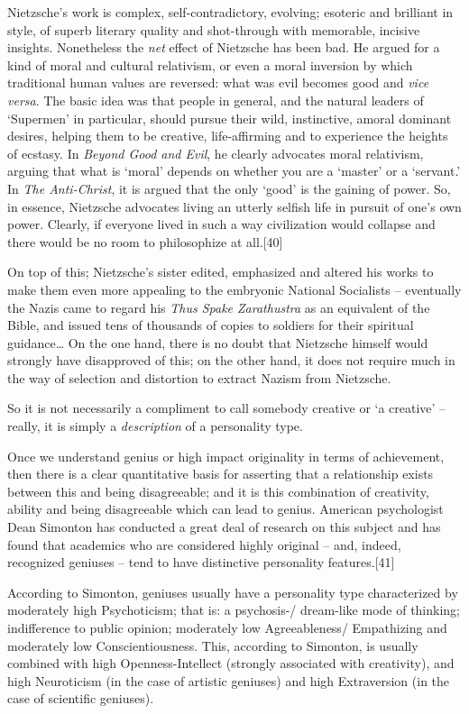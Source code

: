 \documentclass[
]{book}
\begin{document}
Nietzsche's work is complex, self-contradictory, evolving; esoteric and brilliant in style, of superb literary quality and shot-through with memorable, incisive insights. Nonetheless the \emph{net} effect of Nietzsche has been bad. He argued for a kind of moral and cultural relativism, or even a moral inversion by which traditional human values are reversed: what was evil becomes good and \emph{vice versa}. The basic idea was that people in general, and the natural leaders of `Supermen' in particular, should pursue their wild, instinctive, amoral dominant desires, helping them to be creative, life-affirming and to experience the heights of ecstasy. In \emph{Beyond Good and Evil}, he clearly advocates moral relativism, arguing that what is `moral' depends on whether you are a `master' or a `servant.' In \emph{The Anti-Christ}, it is argued that the only `good' is the gaining of power. So, in essence, Nietzsche advocates living an utterly selfish life in pursuit of one's own power. Clearly, if everyone lived in such a way civilization would collapse and there would be no room to philosophize at all.{[}40{]}

On top of this; Nietzsche's sister edited, emphasized and altered his works to make them even more appealing to the embryonic National Socialists -- eventually the Nazis came to regard his \emph{Thus Spake Zarathustra} as an equivalent of the Bible, and issued tens of thousands of copies to soldiers for their spiritual guidance\ldots{} On the one hand, there is no doubt that Nietzsche himself would strongly have disapproved of this; on the other hand, it does not require much in the way of selection and distortion to extract Nazism from Nietzsche.

So it is not necessarily a compliment to call somebody creative or `a creative' -- really, it is simply a \emph{description} of a personality type.

Once we understand genius or high impact originality in terms of achievement, then there is a clear quantitative basis for asserting that a relationship exists between this and being disagreeable; and it is this combination of creativity, ability and being disagreeable which can lead to genius. American psychologist Dean Simonton has conducted a great deal of research on this subject and has found that academics who are considered highly original -- and, indeed, recognized geniuses -- tend to have distinctive personality features.{[}41{]}

According to Simonton, geniuses usually have a personality type characterized by moderately high Psychoticism; that is: a psychosis-/ dream-like mode of thinking; indifference to public opinion; moderately low Agreeableness/ Empathizing and moderately low Conscientiousness. This, according to Simonton, is usually combined with high Openness-Intellect (strongly associated with creativity), and high Neuroticism (in the case of artistic geniuses) and high Extraversion (in the case of scientific geniuses).
\end{document}
